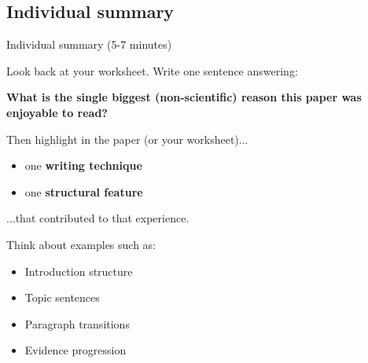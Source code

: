 \documentclass{beamer}
\begin{document}
\subsection{Individual summary}
\begin{frame}{Individual summary (5-7 minutes)}

Look back at your worksheet.
Write one sentence answering:

\vspace{0.3cm}

\textbf{What is the single biggest (non-scientific) reason this paper was enjoyable to read?}

\vspace{0.5cm}

Then highlight in the paper (or your worksheet)...

\begin{itemize}
\item one \textbf{writing technique}
\item one \textbf{structural feature}
\end{itemize}

\hspace{2cm}...that contributed to that experience.


\vspace{0.5cm}

Think about examples such as:

\begin{itemize}
\item Introduction structure
\item Topic sentences
\item Paragraph transitions
\item Evidence progression
\end{itemize}

\end{frame}

\end{document}
